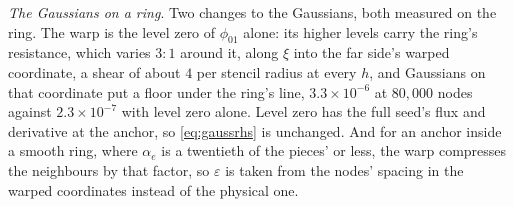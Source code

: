 \documentclass[11pt]{amsart}
\theoremstyle{definition}
\theoremstyle{remark}
\newcommand{\para}[1]{\par\smallskip\noindent\textit{#1}.\enspace}
\newcommand{\sci}[2]{#1 \times 10^{#2}}
\begin{document}
\para{The Gaussians on a ring}
Two changes to the Gaussians, both measured on the ring. The warp is the
level zero of $\phi_{01}$ alone: its higher levels carry the ring's
resistance, which varies $3 : 1$ around it, along $\xi$ into the far side's
warped coordinate, a shear of about $4$ per stencil radius at every $h$, and
Gaussians on that coordinate put a floor under the ring's line,
$\sci{3.3}{-6}$ at $80{,}000$ nodes against $\sci{2.3}{-7}$ with level zero
alone. Level zero has the full seed's flux and derivative at the anchor, so
\eqref{eq:gaussrhs} is unchanged. And for an anchor inside a smooth ring,
where $\alpha_e$ is a twentieth of the pieces' or less, the warp compresses
the neighbours by that factor, so $\varepsilon$ is taken from the nodes'
spacing in the warped coordinates instead of the physical one.
\end{document}
